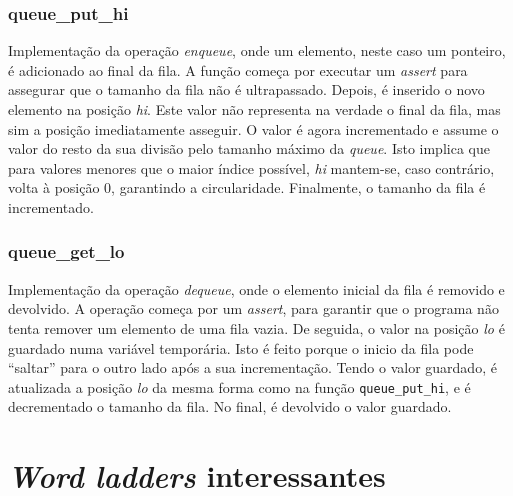 \documentclass[portuguese,11pt,a4paper,titlepage]{article}
\newcommand{\foreign}[1]{\textit{#1}}
\begin{document}
\subsubsection{queue\_put\_hi}
Implementação da operação \foreign{enqueue}, onde um elemento, neste
caso um ponteiro, é adicionado ao final da fila. A função começa por executar um
\foreign{assert} para assegurar que o tamanho da fila não é ultrapassado. Depois,
é inserido o novo elemento na posição \foreign{hi}. Este valor não representa na
verdade o final da fila, mas sim a posição imediatamente asseguir. O valor é agora
incrementado e assume o valor do resto da sua divisão pelo tamanho máximo da 
\foreign{queue}. Isto implica que para valores menores que o maior índice possível,
\foreign{hi} mantem-se, caso contrário, volta à posição 0, garantindo a circularidade.
Finalmente, o tamanho da fila é incrementado.

\subsubsection{queue\_get\_lo}
Implementação da operação \foreign{dequeue}, onde o elemento inicial da fila é
removido e devolvido. A operação começa por um \foreign{assert}, para garantir
que o programa não tenta remover um elemento de uma fila vazia. De seguida, o valor
na posição \foreign{lo} é guardado numa variável temporária. Isto é feito porque
o inicio da fila pode ``saltar'' para o outro lado após a sua incrementação. Tendo
o valor guardado, é atualizada a posição \foreign{lo} da mesma forma como na função
\verb|queue_put_hi|, e é decrementado o tamanho da fila. No final, é devolvido o
valor guardado.

\section{\textit{Word ladders} interessantes}
\end{document}
